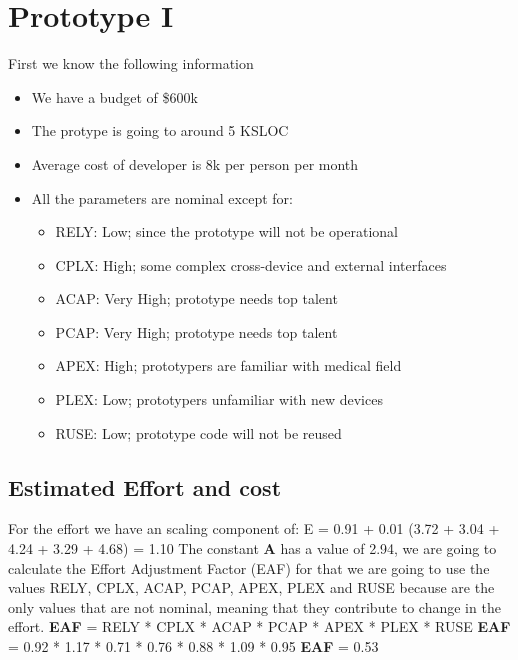 \section{Prototype I}
First we know the following information
\begin{itemize}
    \item We have a budget of \$600k
    \item The protype is going to around 5 KSLOC
    \item Average cost of developer is 8k per person per month
    \item All the parameters are nominal except for:
    \begin{itemize}
        \item RELY: Low; since the prototype will not be operational
        \item CPLX: High; some complex cross-device and external interfaces
        \item ACAP: Very High; prototype needs top talent
        \item PCAP: Very High; prototype needs top talent
        \item APEX: High; prototypers are familiar with medical field
        \item PLEX: Low; prototypers unfamiliar with new devices
        \item RUSE: Low; prototype code will not be reused
    \end{itemize}
\end{itemize}

\subsection{Estimated Effort and cost}
For the effort we have an scaling component of: \newline\newline
E = 0.91 + 0.01 (3.72 + 3.04 + 4.24 + 3.29 + 4.68) = 1.10 \newline\newline
\noindent
The constant \textbf{A} has a value of 2.94, we are going to calculate the Effort Adjustment Factor (EAF) for that we are going to use the values RELY, CPLX, ACAP, PCAP, APEX, PLEX and RUSE because are the only values that are not nominal, meaning that they contribute to  change in the effort. \newline\newline
\textbf{EAF} = RELY * CPLX * ACAP * PCAP * APEX * PLEX * RUSE \newline
\textbf{EAF} = 0.92 * 1.17 * 0.71 * 0.76 * 0.88 * 1.09 * 0.95 \newline
\textbf{EAF} = 0.53\newline\newline

